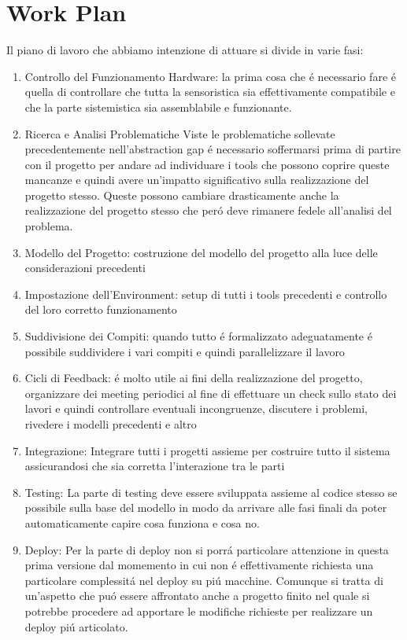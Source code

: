 \section{Work Plan}

Il piano di lavoro che abbiamo intenzione di attuare si divide in varie fasi:

\begin{enumerate}
  \item{Controllo del Funzionamento Hardware:} la prima cosa che \'e necessario fare \'e quella di controllare che tutta la sensoristica sia effettivamente compatibile e che la parte sistemistica sia assemblabile e funzionante.
  \item{Ricerca e Analisi Problematiche} Viste le problematiche sollevate precedentemente nell'abstraction gap \'e necessario soffermarsi prima di partire con il progetto per andare ad individuare i tools che possono coprire queste mancanze e quindi avere un'impatto significativo sulla realizzazione del progetto stesso. Queste possono cambiare drasticamente anche la realizzazione del progetto stesso che per\'o deve rimanere fedele all'analisi del problema.
  \item{Modello del Progetto:} costruzione del modello del progetto alla luce delle considerazioni precedenti
  \item{Impostazione dell'Environment:} setup di tutti i tools precedenti e controllo del loro corretto funzionamento
  \item{Suddivisione dei Compiti:} quando tutto \'e formalizzato adeguatamente \'e possibile suddividere i vari compiti e quindi parallelizzare il lavoro
  \item{Cicli di Feedback:} \'e molto utile ai fini della realizzazione del progetto, organizzare dei meeting periodici al fine di effettuare un check sullo stato dei lavori e quindi controllare eventuali incongruenze, discutere i problemi, rivedere i modelli precedenti e altro
  \item{Integrazione:} Integrare tutti i progetti assieme per costruire tutto il sistema assicurandosi che sia corretta l'interazione tra le parti
  \item{Testing:} La parte di testing deve essere sviluppata assieme al codice stesso se possibile sulla base del modello in modo da arrivare alle fasi finali da poter automaticamente capire cosa funziona e cosa no.
  \item{Deploy:} Per la parte di deploy non si porr\'a particolare attenzione in questa prima versione dal momemento in cui non \'e effettivamente richiesta una particolare complessit\'a nel deploy su pi\'u macchine. Comunque si tratta di un'aspetto che pu\'o essere affrontato anche a progetto finito nel quale si potrebbe procedere ad apportare le modifiche richieste per realizzare un deploy pi\'u articolato.
\end{enumerate}

